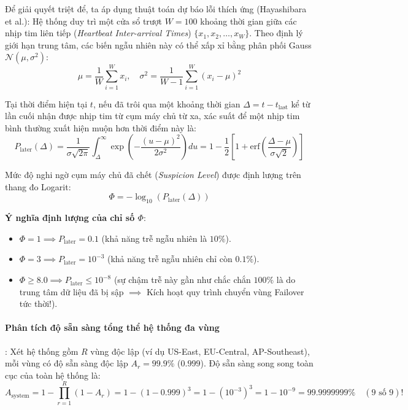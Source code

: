 Để giải quyết triệt để, ta áp dụng thuật toán dự báo lỗi thích ứng  (Hayashibara et al.):
Hệ thống duy trì một cửa sổ trượt $W = 100$ khoảng thời gian giữa các nhịp tim liên tiếp (\textit{Heartbeat Inter-arrival Times}) $\{x_1, x_2, \dots, x_W\}$.
Theo định lý giới hạn trung tâm, các biến ngẫu nhiên này có thể xấp xỉ bằng phân phối Gauss $\mathcal{N}(\mu, \sigma^2)$:
\begin{equation}
\mu = \frac{1}{W} \sum_{i=1}^W x_i, \quad \sigma^2 = \frac{1}{W-1} \sum_{i=1}^W (x_i - \mu)^2
\end{equation}

Tại thời điểm hiện tại $t$, nếu đã trôi qua một khoảng thời gian $\Delta = t - t_{\text{last}}$ kể từ lần cuối nhận được nhịp tim từ cụm máy chủ từ xa, xác suất để một nhịp tim bình thường xuất hiện muộn hơn thời điểm này là:
\begin{equation}
P_{\text{later}}(\Delta) = \frac{1}{\sigma \sqrt{2\pi}} \int_{\Delta}^{\infty} \exp\left(-\frac{(u - \mu)^2}{2\sigma^2}\right) du = 1 - \frac{1}{2} \left[ 1 + \text{erf}\left(\frac{\Delta - \mu}{\sigma \sqrt{2}}\right) \right]
\end{equation}

Mức độ nghi ngờ cụm máy chủ đã chết (\textit{Suspicion Level}) được định lượng trên thang đo Logarit:
\begin{equation}
\Phi = - \log_{10}\left( P_{\text{later}}(\Delta) \right)
\end{equation}

\textbf{Ý nghĩa định lượng của chỉ số $\Phi$}:
\begin{itemize}
  \item $\Phi = 1 \implies P_{\text{later}} = 0.1$ (khả năng trễ ngẫu nhiên là $10\%$).
  \item $\Phi = 3 \implies P_{\text{later}} = 10^{-3}$ (khả năng trễ ngẫu nhiên chỉ còn $0.1\%$).
  \item $\Phi \ge 8.0 \implies P_{\text{later}} \le 10^{-8}$ (sự chậm trễ này gần như chắc chắn $100\%$ là do trung tâm dữ liệu đã bị sập $\implies$ Kích hoạt quy trình chuyển vùng Failover tức thời!).
\end{itemize}

\paragraph{Phân tích độ sẵn sàng tổng thể hệ thống đa vùng}:
Xét hệ thống gồm $R$ vùng độc lập (ví dụ US-East, EU-Central, AP-Southeast), mỗi vùng có độ sẵn sàng độc lập $A_r = 99.9\%$ ($0.999$). Độ sẵn sàng song song toàn cục của toàn hệ thống là:
\begin{equation}
A_{\text{system}} = 1 - \prod_{r=1}^R (1 - A_r) = 1 - (1 - 0.999)^3 = 1 - (10^{-3})^3 = 1 - 10^{-9} = \mathbf{99.9999999\%} \quad (\text{9 số 9})!
\end{equation}

